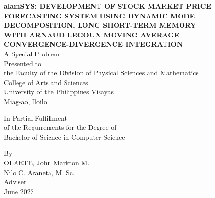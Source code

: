 \begin{titlepage}
\centering

\vspace{0.05cm}
\textbf{alamSYS: DEVELOPMENT OF STOCK MARKET PRICE FORECASTING SYSTEM USING DYNAMIC MODE DECOMPOSITION, LONG SHORT-TERM MEMORY \\ WITH ARNAUD LEGOUX MOVING AVERAGE \\ CONVERGENCE-DIVERGENCE INTEGRATION} \\

\vspace{1.5cm}
A Special Problem\\
Presented to\\
the Faculty of the Division of Physical Sciences and Mathematics\\
College of Arts and Sciences\\
University of the Philippines Visayas\\
Miag-ao, Iloilo

\vspace{1.5cm}
In Partial Fulfillment\\
of the Requirements for the Degree of\\
Bachelor of Science in Computer Science
\vspace{1.5cm}

By\\
OLARTE, John Markton M.  \\

\vspace{1.5cm}
Nilo C. Araneta, M. Sc.\\
Adviser\\

\vspace{1.5cm}
June 2023
\end{titlepage}
    